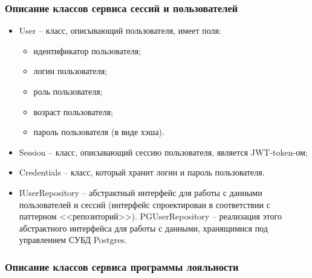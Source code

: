\subsubsection{Описание классов сервиса сессий и пользователей}

\begin{itemize}
    \item User -- класс, описывающий пользователя, имеет поля:
    \begin{itemize}
        \item идентификатор пользователя;
        \item логин пользователя;
        \item роль пользователя;
        \item возраст пользователя;
        \item пароль пользователя (в виде хэша).
    \end{itemize}
    \item Session -- класс, описывающий сессию пользователя, является JWT-token-ом;
    \item Credentials -- класс, который хранит логин и пароль пользователя.
    \item IUserRepository -- абстрактный интерфейс для работы с данными пользователей и сессий (интерфейс спроектирован в соответствии с паттерном <<репозиторий>>). PGUserRepository -- реализация этого абстрактного интерфейса для работы с данными, хранящимися под управлением СУБД Postgres.
\end{itemize}

\subsubsection{Описание классов сервиса программы лояльности}

